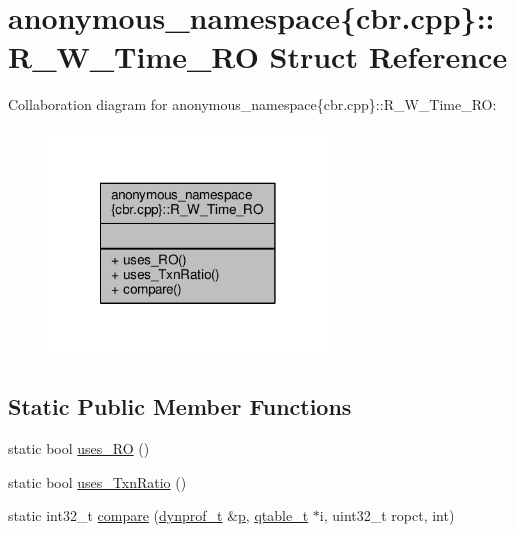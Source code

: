 \hypertarget{structanonymous__namespace_02cbr_8cpp_03_1_1R__W__Time__RO}{\section{anonymous\-\_\-namespace\{cbr.\-cpp\}\-:\-:R\-\_\-\-W\-\_\-\-Time\-\_\-\-R\-O Struct Reference}
\label{structanonymous__namespace_02cbr_8cpp_03_1_1R__W__Time__RO}
}


Collaboration diagram for anonymous\-\_\-namespace\{cbr.\-cpp\}\-:\-:R\-\_\-\-W\-\_\-\-Time\-\_\-\-R\-O\-:
\nopagebreak
\begin{figure}[H]
\begin{center}
\leavevmode
\includegraphics[width=210pt]{structanonymous__namespace_02cbr_8cpp_03_1_1R__W__Time__RO__coll__graph}
\end{center}
\end{figure}
\subsection*{Static Public Member Functions}
\begin{DoxyCompactItemize}
\item 
static bool \hyperlink{structanonymous__namespace_02cbr_8cpp_03_1_1R__W__Time__RO_a640d440830b9f4676609d7b1fae4282e}{uses\-\_\-\-R\-O} ()
\item 
static bool \hyperlink{structanonymous__namespace_02cbr_8cpp_03_1_1R__W__Time__RO_a7a38c7f3d7a90b12dd7ab6e9ee15d6fe}{uses\-\_\-\-Txn\-Ratio} ()
\item 
static int32\-\_\-t \hyperlink{structanonymous__namespace_02cbr_8cpp_03_1_1R__W__Time__RO_ac76736a759d1bb531d1af882538d33c9}{compare} (\hyperlink{structstm_1_1dynprof__t}{dynprof\-\_\-t} \&\hyperlink{counted__ptr_8hpp_a5c9f59d7c24e3fd6ceae319a968fc3e0}{p}, \hyperlink{structstm_1_1qtable__t}{qtable\-\_\-t} $\ast$i, uint32\-\_\-t ropct, int)
\end{DoxyCompactItemize}



